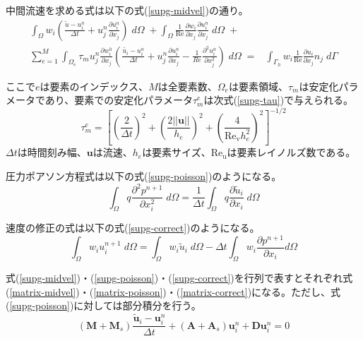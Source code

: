 \documentclass[8pt,a4paper]{article}
\newcommand{\bm}{\boldsymbol}
\begin{document}
中間流速を求める式は以下の式(\ref{supg-midvel})の通り。
\begin{equation}
\label{supg-midvel}
	\begin{split}
		\int_{\Omega} w_{i}\left( \frac{\tilde{u}-u^{n}_i}{\Delta t} + u^{n}_{j} \frac{\partial u^{n}_{i}}{\partial x_{j}}\right) \; d\Omega \;+ 
		\int_{\Omega} \frac{1}{\mathrm{Re}} \frac{\partial w_{i}}{\partial x_{j}} \frac{\partial u^{n}_{i}}{\partial x_{j}} \; d\Omega \;+& \\
		\sum_{e=1}^{M} \int_{\Omega_{e}} \tau_{m} u_{j}^{n} \frac{\partial w_{i}^{h}}{\partial x_{j}} \left( \frac{\tilde{u_{i}} - u_{i}^{n}}{\Delta t} + u_{j}^{n} \frac{\partial u_{i}^{n}}{\partial x_{j}} - \frac{1}{Re} \frac{\partial^{2} u_{i}^{n}}{\partial x_{j}^{2}}\right) \; d\Omega \;=& 
		\int_{\Gamma_{h}} w_{i}\frac{1}{\mathrm{Re}} \frac{\partial u_{i}}{\partial x_{j}}n_{j} \;d\Gamma
	\end{split}
\end{equation}

ここで$e$は要素のインデックス、$M$は全要素数、$\Omega_{e}$は要素領域、$\tau_{m}$は安定化パラメータであり、要素での安定化パラメータ$\tau_{m}^{e}$は次式(\ref{supg-tau})で与えられる。
\begin{equation}
\label{supg-tau}
	\tau_{m}^{e}=\left[ \left(\frac{2}{\Delta t}\right)^{2} + \left(\frac{2||\bm{u}||}{h_{e}}\right)^{2} + \left(\frac{4}{\mathrm{Re_{v}} h_{e}^{2}}\right)^{2}\right]^{-1/2}
\end{equation}
$\Delta t$は時間刻み幅、$\bm{u}$は流速、$h_e$は要素サイズ、$\mathrm{Re_u}$は要素レイノルズ数である。

圧力ポアソン方程式は以下の式(\ref{supg-poisson})のようになる。
\begin{equation}
\label{supg-poisson}
	\int_{\Omega} q \frac{\partial^{2}p^{n+1}}{\partial x_{i}^{2}} \; d\Omega = 
	\frac{1}{\Delta t} \int_{\Omega} q \frac{\partial \tilde{u}_{i}}{\partial x_{i}} \; d\Omega
\end{equation}

速度の修正の式は以下の式(\ref{supg-correct})のようになる。
\begin{equation}
\label{supg-correct}
	\int_{\Omega} w_{i}u_{i}^{n+1} \; d\Omega = \int_{\Omega} w_{i} \tilde{u}_{i} \; d\Omega
	- \Delta t \int_{\Omega} w_{i} \frac{\partial p^{n+1}}{\partial x_{i}} d\Omega
\end{equation}

式(\ref{supg-midvel})・(\ref{supg-poisson})・(\ref{supg-correct})を行列で表すとそれぞれ式(\ref{matrix-midvel})・(\ref{matrix-poisson})・(\ref{matrix-correct})になる。ただし、式(\ref{supg-poisson})に対しては部分積分を行う。
\begin{equation}
\label{matrix-midvel}
	( \bm{M} + \bm{M}_{s} ) \frac{\tilde{\bm{u}}_i - \bm{u}_{i}^{n}}{\Delta t} + ( \bm{A} + \bm{A}_s ) \bm{u}_{i}^{n} + \bm{D} \bm{u}_{i}^{n} = 0
\end{equation}
\end{document}
